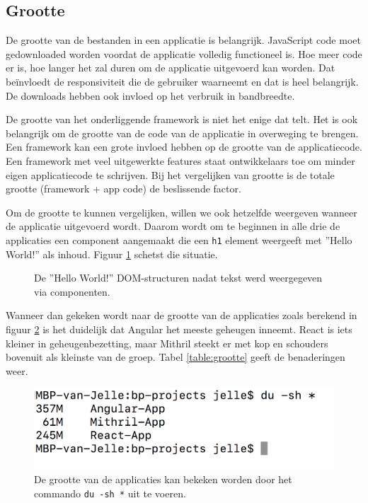\subsection{Grootte}

De grootte van de bestanden in een applicatie is belangrijk. JavaScript code moet gedownloaded worden voordat de applicatie volledig functioneel is. Hoe meer code er is, hoe langer het zal duren om de applicatie uitgevoerd kan worden. Dat beïnvloedt de responsiviteit die de gebruiker waarneemt en dat is heel belangrijk. De downloads hebben ook invloed op het verbruik in bandbreedte. \autocite{Coulman2015}

De grootte van het onderliggende framework is niet het enige dat telt. Het is ook belangrijk om de grootte van de code van de applicatie in overweging te brengen. Een framework kan een grote invloed hebben op de grootte van de applicatiecode. Een framework met veel uitgewerkte features staat ontwikkelaars toe om minder eigen applicatiecode te schrijven. Bij het vergelijken van grootte is de totale grootte (framework + app code) de beslissende factor. \autocite{Coulman2015}

Om de grootte te kunnen vergelijken, willen we ook hetzelfde weergeven wanneer de applicatie uitgevoerd wordt. Daarom wordt om te beginnen in alle drie de applicaties een component aangemaakt die een \texttt{h1} element weergeeft met ''Hello World!'' als inhoud. Figuur \ref{fig:hello-world} schetst die situatie.

\begin{figure}[!ht]
    \hfill
    \hfill
    \caption{De ''Hello World!'' DOM-structuren nadat tekst werd weergegeven via componenten.}
    \label{fig:hello-world}
\end{figure}

Wanneer dan gekeken wordt naar de grootte van de applicaties zoals berekend in figuur \ref{fig:grootte} is het duidelijk dat Angular het meeste geheugen inneemt. React is iets kleiner in geheugenbezetting, maar Mithril steekt er met kop en schouders bovenuit als kleinste van de groep. Tabel \ref{table:grootte} geeft de benaderingen weer.

\begin{figure}
    \includegraphics[width=\textwidth]{./img/grootte.png}
    \caption{De grootte van de applicaties kan bekeken worden door het commando \texttt{du -sh *} uit te voeren.}
    \label{fig:grootte}
\end{figure}

